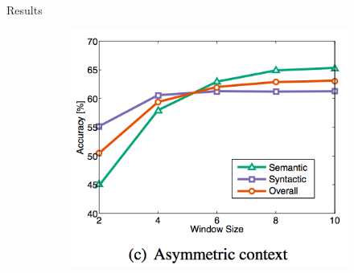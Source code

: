 \begin{frame}{Results}
\begin{figure}
\begin{subfigure}[b]{0.33\textwidth}
    \end{subfigure}%
    \begin{subfigure}[b]{0.33\textwidth}
      \includegraphics[width=\textwidth]{images/analogy3.png}
    \end{subfigure}%
  \end{figure}
\end{frame}
